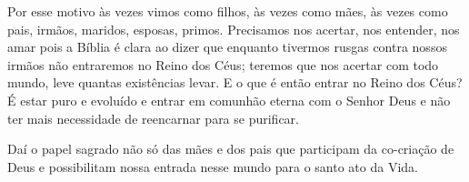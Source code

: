 \emdash{}Por esse motivo às vezes vimos como filhos, às vezes como mães, às vezes como pais, irmãos, maridos, esposas, primos. Precisamos nos acertar, nos entender, nos amar pois a Bíblia é clara ao dizer que enquanto tivermos rusgas contra nossos irmãos não entraremos no Reino dos Céus; teremos que nos acertar com todo mundo, leve quantas existências levar. E o que é então entrar no Reino dos Céus? É estar puro e evoluído e entrar em comunhão eterna com o Senhor Deus e não ter mais necessidade de reencarnar para se purificar.

\emdash{}Daí o papel sagrado não só das mães e dos pais  que participam da co-criação de Deus e possibilitam nossa entrada nesse mundo para o santo ato da Vida.